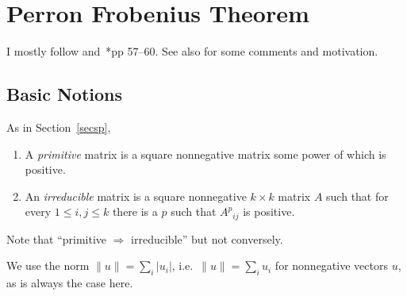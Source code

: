 \documentclass[a4paper]{amsart}
\theoremstyle{plain}
\theoremstyle{definition}
\theoremstyle{remark}
\begin{document}










\section{\textbf{Perron Frobenius Theorem}}   I mostly follow \cite{Boy} and~\cite{ Bri}*{pp 57--60}.  See also \cite{Boyd} for some comments and motivation.

\subsection{Basic Notions}
As in Section~\ref{secsp}, 
\begin{enumerate}

\item  A \emph{primitive} matrix is a square nonnegative matrix some power of which is positive.

\item An \emph{irreducible} matrix is a square nonnegative $ k\times k $ matrix $ A $ such that for every $1\leq  i,j \leq k $ there is a $ p $ such that $ {A^p}_{ij} $ is positive.
\end{enumerate} 

Note that ``primitive $ \Longrightarrow $ irreducible'' but not conversely.

We use the norm $ \|u\|= \sum_i |u_i| $, i.e.\  $ \|u\|= \sum_i u_i $ for nonnegative vectors $ u $, as is always the case here.

\end{document}
